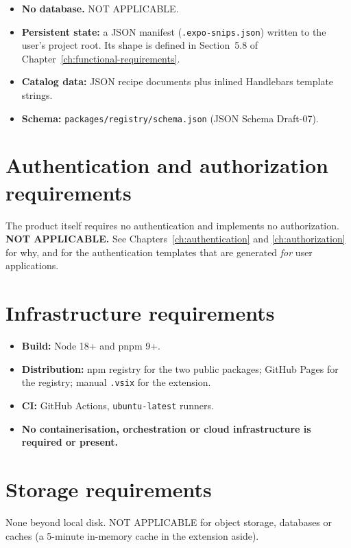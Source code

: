 \begin{itemize}
  \item \textbf{No database.} NOT APPLICABLE.
  \item \textbf{Persistent state:} a JSON manifest (\texttt{.expo-snips.json})
        written to the user's project root. Its shape is defined in
        Section~5.8 of Chapter~\ref{ch:functional-requirements}.
  \item \textbf{Catalog data:} JSON recipe documents plus inlined Handlebars
        template strings.
  \item \textbf{Schema:} \texttt{packages/registry/schema.json}
        (JSON Schema Draft-07).
\end{itemize}

\section{Authentication and authorization requirements}

The product itself requires no authentication and implements no authorization.
\textbf{NOT APPLICABLE.} See Chapters~\ref{ch:authentication} and
\ref{ch:authorization} for why, and for the authentication templates that are
generated \emph{for} user applications.

\section{Infrastructure requirements}

\begin{itemize}
  \item \textbf{Build:} Node 18+ and pnpm 9+.
  \item \textbf{Distribution:} npm registry for the two public packages; GitHub
        Pages for the registry; manual \texttt{.vsix} for the extension.
  \item \textbf{CI:} GitHub Actions, \texttt{ubuntu-latest} runners.
  \item \textbf{No containerisation, orchestration or cloud infrastructure is
        required or present.}
\end{itemize}

\section{Storage requirements}

None beyond local disk. NOT APPLICABLE for object storage, databases or caches
(a 5-minute in-memory cache in the extension aside).


